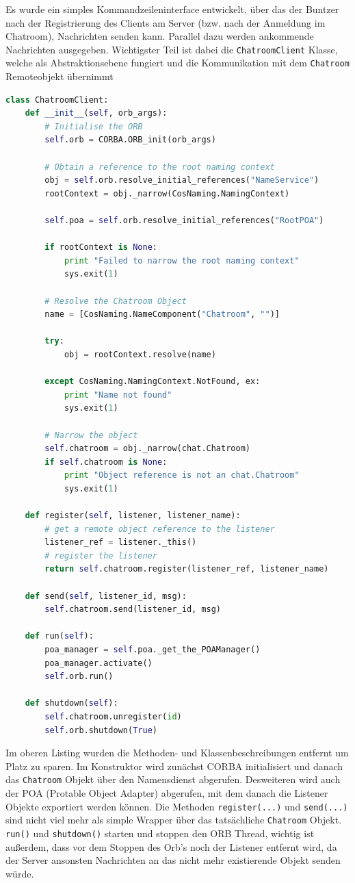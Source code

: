Es wurde ein simples Kommandzeileninterface entwickelt, \"uber das der Buntzer nach der Registrierung des Clients am Server (bzw. nach der Anmeldung im Chatroom), Nachrichten senden kann.
Parallel dazu werden ankommende Nachrichten ausgegeben.
Wichtigster Teil ist dabei die \texttt{ChatroomClient} Klasse, welche als Abstraktionsebene fungiert und die Kommunikation mit dem \texttt{Chatroom} Remoteobjekt \"ubernimmt
\begin{lstlisting}[language={Python}, caption=Chatroom Klasse des Clients als Abstraktionsebene zu CORBA]
class ChatroomClient:
    def __init__(self, orb_args):
        # Initialise the ORB
        self.orb = CORBA.ORB_init(orb_args)

        # Obtain a reference to the root naming context
        obj = self.orb.resolve_initial_references("NameService")
        rootContext = obj._narrow(CosNaming.NamingContext)

        self.poa = self.orb.resolve_initial_references("RootPOA")

        if rootContext is None:
            print "Failed to narrow the root naming context"
            sys.exit(1)

        # Resolve the Chatroom Object
        name = [CosNaming.NameComponent("Chatroom", "")]

        try:
            obj = rootContext.resolve(name)

        except CosNaming.NamingContext.NotFound, ex:
            print "Name not found"
            sys.exit(1)

        # Narrow the object
        self.chatroom = obj._narrow(chat.Chatroom)
        if self.chatroom is None:
            print "Object reference is not an chat.Chatroom"
            sys.exit(1)

    def register(self, listener, listener_name):
        # get a remote object reference to the listener
        listener_ref = listener._this()
        # register the listener
        return self.chatroom.register(listener_ref, listener_name)

    def send(self, listener_id, msg):
        self.chatroom.send(listener_id, msg)

    def run(self):
        poa_manager = self.poa._get_the_POAManager()
        poa_manager.activate()
        self.orb.run()

    def shutdown(self):
        self.chatroom.unregister(id)
        self.orb.shutdown(True)
\end{lstlisting}
Im oberen Listing wurden die Methoden- und Klassenbeschreibungen entfernt um Platz zu sparen.
Im Konstruktor wird zun\"achst CORBA initialisiert und danach das \texttt{Chatroom} Objekt \"uber den Namensdienst abgerufen.
Desweiteren wird auch der POA (Protable Object Adapter) abgerufen, mit dem danach die Listener Objekte exportiert werden k\"onnen.
Die Methoden \texttt{register(...)} und \texttt{send(...)} sind nicht viel mehr als simple Wrapper \"uber das tats\"achliche \texttt{Chatroom} Objekt.
\texttt{run()} und \texttt{shutdown()} starten und stoppen den ORB Thread, wichtig ist au\ss erdem, dass vor dem Stoppen des Orb's noch der Listener entfernt wird, da der Server ansonsten Nachrichten an das nicht mehr existierende Objekt senden w\"urde.

